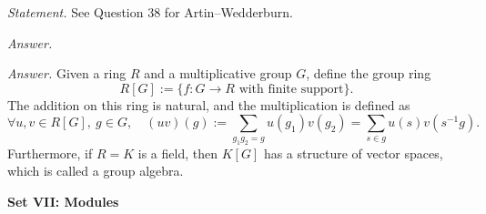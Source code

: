\documentclass{mathproblems}
\begin{document}
\begin{questions}
\textit{Statement.} See Question 38 for Artin--Wedderburn.

\textit{Answer.} 


\textit{Answer.} Given a ring $R$ and a multiplicative group $G$, define the group ring
$$
R[G]:=\{f:G\to R \text{ with finite support}\}.
$$
The addition on this ring is natural, and the multiplication is defined as
$$
\forall u,v\in R[G],\ g\in G,\quad (u v)(g):=\sum_{g_1 g_2=g}u(g_1)v(g_2)=\sum_{s\in g} u(s) v(s^{-1}g).
$$
Furthermore, if $R=K$ is a field, then $K[G]$ has a structure of vector spaces, which is called a group algebra.

\end{questions}

\newpage
\centerline{\textbf{Set VII: Modules}}
\end{document}

